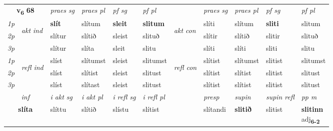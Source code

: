 \noindent
\begin{tabular}{lllllllllll} \toprule
\multicolumn{2}{c}{\textbf{v{\textsubscript{6}}} \Large{\textbf{68}}}  &  \textit{praes sg}  & \textit{praes pl}  &\textit{ pf sg} & \textit{pf pl} &  &  \textit{praes sg}  & \textit{praes pl}  & \textit{pf sg} & \textit{pf pl } \\*
	\cmidrule{3-6} \cmidrule{8-11}
 {\textit{1p}} & \multirow{3}{*}{\begin{turn}{90}\textit{akt ind}\end{turn}} & \textbf{slít} & slítum & \textbf{sleit} & \textbf{slitum} & \multirow{3}{*}{\begin{turn}{90}\textit{akt con}\end{turn}} &slíti & slítum & \textbf{sliti} & slitum\\*
 {\textit{2p}} &  &  slítur  & slítið & sleist & slituð & & slítir & slítið & slitir & slituð \\*
{\textit{3p}} &  & slítur & slíta & sleit & slitu & & slíti & slíti& sliti & slitu \\*
\cmidrule{3-6} \cmidrule{8-11}
 {\textit{1p}} & \multirow{3}{*}{\begin{turn}{90}\textit{refl ind}\end{turn}}  & slíst & slítumst & sleist & slitumst & \multirow{3}{*}{\begin{turn}{90}\textit{refl con}\end{turn}}  &slítist & slítumst & slitist & slitumst \\*
 {\textit{2p}} &  & slíst & slítist & sleist & slitust & &slítist & slítist & slitist & slitust \\*
 {\textit{3p}}  & & slíst & slítast & sleist & slitust & & slítist & slítist& slitist & slitust \\*
\cmidrule{3-6} \cmidrule{8-11}

   \multicolumn{2}{c}{\textit{inf}}  & \textit{i akt sg} & \textit{i akt pl} & \textit{i refl sg} & \textit{i refl pl} && \textit{presp} & \textit{supin} & \textit{supin refl} & \textit{pp m} \\*
  \multicolumn{2}{c}{\textbf{slíta}} & slíttu  & slítið & slístu & slítist && slítandi &  \textbf{slitið} & slitist & \specialcell{\textbf{slitinn} \\ adj\textbf{\textsubscript{6-2}}} \\*
\end{tabular}


